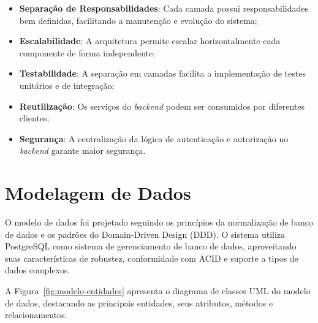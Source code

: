 \begin{itemize}
    \item \textbf{Separação de Responsabilidades}: Cada camada possui responsabilidades bem definidas, facilitando a manutenção e evolução do sistema;
    \item \textbf{Escalabilidade}: A arquitetura permite escalar horizontalmente cada componente de forma independente;
    \item \textbf{Testabilidade}: A separação em camadas facilita a implementação de testes unitários e de integração;
    \item \textbf{Reutilização}: Os serviços do \textit{backend} podem ser consumidos por diferentes clientes;
    \item \textbf{Segurança}: A centralização da lógica de autenticação e autorização no \textit{backend} garante maior segurança.
\end{itemize}

\section{Modelagem de Dados}

O modelo de dados foi projetado seguindo os princípios da normalização de banco de dados e os padrões do Domain-Driven Design (DDD). O sistema utiliza PostgreSQL como sistema de gerenciamento de banco de dados, aproveitando suas características de robustez, conformidade com ACID e suporte a tipos de dados complexos.

A Figura~\ref{fig:modelo-entidades} apresenta o diagrama de classes UML do modelo de dados, destacando as principais entidades, seus atributos, métodos e relacionamentos.

